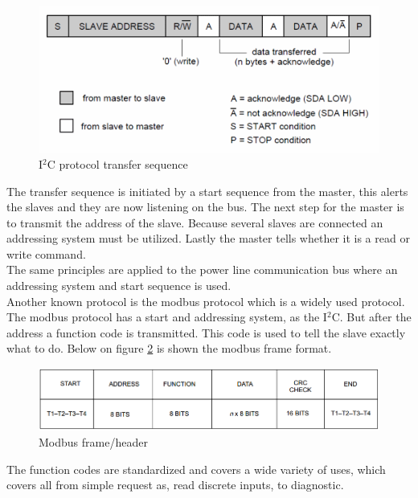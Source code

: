 \begin{figure}[H]
	\centering
	\includegraphics[width=.8\textwidth]{billeder/10technologystudies/7-bit-address-writing}
	\caption{I$^2$C protocol transfer sequence}
	\label{fig:i2cheader}
\end{figure}

The transfer sequence is initiated by a start sequence from the master, this alerts the slaves and they are now listening on the bus. The next step for the master is to transmit the address of the slave. Because several slaves are connected an addressing system must be utilized. Lastly the master tells whether it is a read or write command. \\
The same principles are applied to the power line communication bus where an addressing system and start sequence is used.\\

Another known protocol is the modbus protocol which is a widely used protocol. The modbus protocol has a start and addressing system, as the I$^2$C. But after the address a function code is transmitted. This code is used to tell the slave exactly what to do. Below on figure \ref{fig:modbusframe} is shown the modbus frame format.

\begin{figure}[H]
	\centering
	\includegraphics[width=.8\textwidth]{billeder/10technologystudies/modbusframe}
	\caption{Modbus frame/header}
	\label{fig:modbusframe}
\end{figure}

The function codes are standardized and covers a wide variety of uses, which covers all from simple request as, read discrete inputs, to diagnostic.


